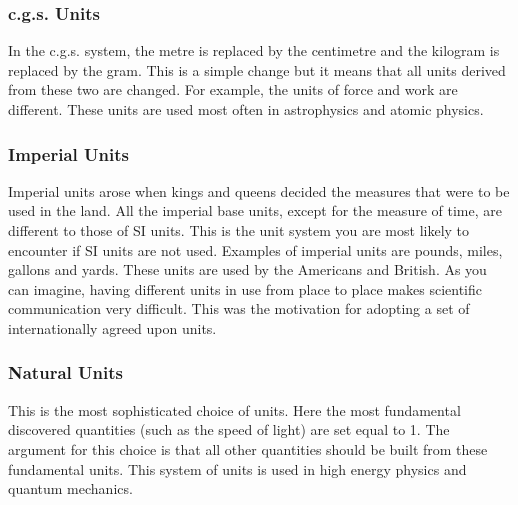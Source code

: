             \subsubsection*{c.g.s. Units}
            \nopagebreak
          \label{m30853*id62899}In the c.g.s. system, the metre is replaced by the centimetre and
the kilogram is replaced by the gram. This is a simple change but
it means that all units derived from these two are changed. For
example, the units of force and work are different. These units
are used most often in astrophysics and atomic physics.\par 
        \label{m30853*uid5}
            \subsubsection*{Imperial Units}
            \nopagebreak
          \label{m30853*id62914}Imperial units arose when kings and queens decided the measures
that were to be used in the land. All the imperial base units,
except for the measure of time, are different to those of SI
units. This is the unit system you are most likely to encounter if
SI units are not used. Examples of imperial units are pounds,
miles, gallons and yards. These units are used by the Americans and
British. As you can imagine, having different units in use from
place to place makes scientific communication very difficult. This
was the motivation for adopting a set of internationally agreed
upon units.\par 
        \label{m30853*uid6}
            \subsubsection*{Natural Units}
            \nopagebreak
          \label{m30853*id62932}This is the most sophisticated choice of units. Here the most
fundamental discovered quantities (such as the speed of light) are
set equal to 1. The argument for this choice is that all other
quantities should be built from these fundamental units. This
system of units is used in high energy physics and quantum
mechanics.\par 
